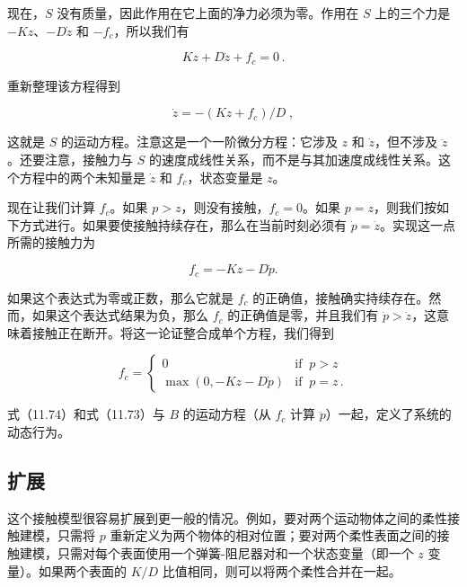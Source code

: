 \documentclass[10pt,a4paper]{book}
\theoremstyle{thmstyle} %
\theoremstyle{defstyle} %
\theoremstyle{prostyle} %
\begin{document}
现在，$S$ 没有质量，因此作用在它上面的净力必须为零。作用在 $S$ 上的三个力是 $-Kz$、$-D\dot{z}$ 和 $-f_{c}$，所以我们有



$$
K z + D \dot { z } + f _ { c } = 0 \, .
$$



重新整理该方程得到



$$
\dot { z } = - ( K z + f _ { c } ) / D \; ,
$$



这就是 $S$ 的运动方程。注意这是一个一阶微分方程：它涉及 $z$ 和 $\dot{z}$，但不涉及 $\ddot{z}$。还要注意，接触力与 $S$ 的速度成线性关系，而不是与其加速度成线性关系。这个方程中的两个未知量是 $\dot{z}$ 和 $f_{c}$，状态变量是 $z$。



现在让我们计算 $f_{c}$。如果 $p > z$，则没有接触，$f_{c} = 0$。如果 $p = z$，则我们按如下方式进行。如果要使接触持续存在，那么在当前时刻必须有 $\dot{p} = \dot{z}$。实现这一点所需的接触力为



$$
f _ { c } = - K z - D \dot { p } .
$$



如果这个表达式为零或正数，那么它就是 $f_{c}$ 的正确值，接触确实持续存在。然而，如果这个表达式结果为负，那么 $f_{c}$ 的正确值是零，并且我们有 $\dot{p} > \dot{z}$，这意味着接触正在断开。将这一论证整合成单个方程，我们得到



$$
f _ { c } = \left\{ \begin{array}{ll} { 0 } & { \mathrm { i f } \; \; p > z } \\{ \operatorname* { m a x } ( 0 , - K z - D \dot { p } ) } & { \mathrm { i f } \; \; p = z \, . } \end{array} \right.
$$



式（11.74）和式（11.73）与 $B$ 的运动方程（从 $f_c$ 计算 $\ddot{p}$）一起，定义了系统的动态行为。



\subsection{扩展}





这个接触模型很容易扩展到更一般的情况。例如，要对两个运动物体之间的柔性接触建模，只需将 $p$ 重新定义为两个物体的相对位置；要对两个柔性表面之间的接触建模，只需对每个表面使用一个弹簧-阻尼器对和一个状态变量（即一个 $z$ 变量）。如果两个表面的 $K/D$ 比值相同，则可以将两个柔性合并在一起。
\end{document}
